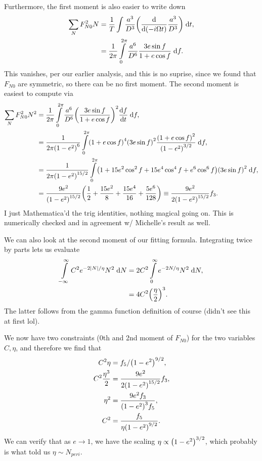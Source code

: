 \documentclass[11pt,
        usenames, %
        dvipsnames %
    ]{article}
\newcommand*{\rd}[2]{\frac{\mathrm{d}#1}{\mathrm{d}#2}}
\DeclarePairedDelimiter\abs{\lvert}{\rvert}
\DeclarePairedDelimiter\p{\lparen}{\rparen}
\begin{document}
Furthermore, the first moment is also easier to write down
\begin{align}
    \sum\limits_N F_{N0}^2N
        &= \frac{1}{T} \int\limits \frac{a^3}{D^3}
            \p*{\rd{}{\p*{-i \Omega t}} \frac{a^3}{D^3}}\;\mathrm{d}t,\\
        &= \frac{1}{2\pi}\int\limits_0^{2\pi}
            \frac{a^6}{D^6} \frac{3e\sin f}{1 + e \cos f} \;\mathrm{d}f.
\end{align}
This vanishes, per our earlier analysis, and this is no suprise, since we found
that $F_{N0}$ are symmetric, so there can be no first moment. The second moment
is easiest to compute via
\begin{align}
    \sum\limits_N F_{N0}^2N^2
        &= \frac{1}{2\pi}\int\limits_0^{2\pi}
            \frac{a^6}{D^6} \p*{\frac{3e\sin f}{1 + e \cos f}}^2
                \rd{f}{t}\;\mathrm{d}f
                ,\\
        &= \frac{1}{2\pi\p*{1 - e^2}^6}\int\limits_0^{2\pi}
            \p*{1 + e\cos f}^4\p*{3e\sin f}^2
                \frac{\p*{1 + e \cos f}^2}{\p*{1 - e^2}^{3/2}}\;\mathrm{d}f,\\
        &= \frac{1}{2\pi\p*{1 - e^2}^{15/2}}\int\limits_0^{2\pi}
            \p*{1 + 15e^2\cos^2f + 15e^4\cos^4f
                + e^6\cos^6 f}\p*{3e\sin f}^2\;\mathrm{d}f,\\
        &= \frac{9e^2}{\p*{1 - e^2}^{15/2}}\p*{
            \frac{1}{2} + \frac{15e^2}{8} + \frac{15e^4}{16}
                + \frac{5e^6}{128}}
            \equiv \frac{9e^2}{2\p*{1 - e^2}^{15/2}}f_3.
\end{align}
I just Mathematica'd the trig identities, nothing magical going on. This is
numerically checked and in agreement w/ Michelle's result as well.

We can also look at the second moment of our fitting formula. Integrating twice
by parts lets us evaluate
\begin{align}
    \int\limits_{-\infty}^\infty C^2e^{-2\abs*{N} / \eta} N^2\;\mathrm{d}N
        &= 2C^2\int\limits_0^\infty e^{-2N/\eta}N^2\;\mathrm{d}N,\\
        &= 4C^2\p*{\frac{\eta}{2}}^3.
\end{align}
The latter follows from the gamma function definition of course (didn't see this
at first lol).

We now have two constraints (0th and 2nd moment of $F_{N0}$) for the two
variables $C, \eta$, and therefore we find that
\begin{align}
    C^2\eta &= f_5 / \p*{1 - e^2}^{9/2},\\
    C^2 \frac{\eta^3}{2} &= \frac{9e^2}{2\p*{1 - e^2}^{15/2}}f_3,\\
    \eta^2 &= \frac{9e^2f_3}{\p*{1 - e^2}^{3}f_5},\\
    C^2 &= \frac{f_5}{\eta\p*{1 - e^2}^{9/2}}.
\end{align}
We can verify that as $e \to 1$, we have the scaling $\eta \propto \p*{1 -
e^2}^{3/2}$, which probably is what told us $\eta \sim N_{peri}$.
\end{document}
